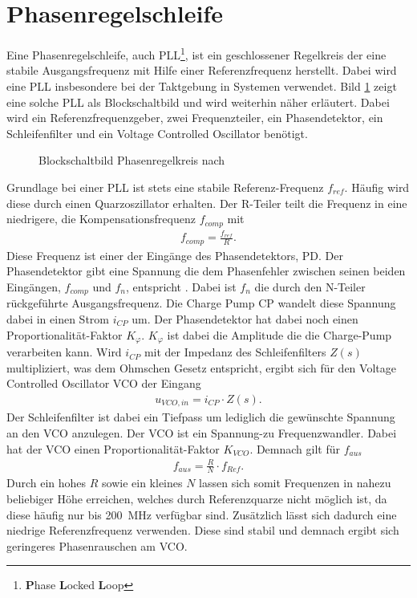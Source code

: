 \section{Phasenregelschleife}
Eine Phasenregelschleife, auch PLL\footnote{ \textbf{P}hase \textbf{L}ocked \textbf{L}oop}, ist ein geschlossener Regelkreis der eine stabile Ausgangsfrequenz mit Hilfe einer Referenzfrequenz herstellt. Dabei wird eine PLL insbesondere bei der Taktgebung in Systemen verwendet. Bild \ref{fig:PLL_Blockerino} zeigt eine solche PLL als Blockschaltbild und wird weiterhin näher erläutert. Dabei wird ein Referenzfrequenzgeber, zwei Frequenzteiler, ein Phasendetektor, ein Schleifenfilter und ein Voltage Controlled Oscillator benötigt.
\begin{figure}[tbp]
  \centering
  
  \caption{Blockschaltbild Phasenregelkreis nach \cite[S.9]{PLL_Perf}}
  \label{fig:PLL_Blockerino}
\end{figure}
Grundlage bei einer PLL ist stets eine stabile Referenz-Frequenz $f_{ref}$. Häufig wird diese durch einen Quarzoszillator erhalten. Der R-Teiler teilt die Frequenz in eine niedrigere, die Kompensationsfrequenz $f_{comp}$ mit 
\begin{align}
f_{comp} = \frac{f_{ref}}{R}.
\end{align} 
Diese Frequenz ist einer der Eingänge des Phasendetektors, PD. Der Phasendetektor gibt eine Spannung die dem Phasenfehler zwischen seinen beiden Eingängen, $f_{comp}$ und $f_{n}$, entspricht .  Dabei ist $f_{n}$ die durch den N-Teiler rückgeführte Ausgangsfrequenz. Die Charge Pump CP wandelt diese Spannung dabei in einen Strom $i_{CP}$ um. Der Phasendetektor hat dabei noch einen Proportionalität-Faktor $K_{\varphi}$. $K_{\varphi}$ ist dabei die Amplitude die die Charge-Pump verarbeiten kann. Wird $i_{CP}$ mit der Impedanz des Schleifenfilters $Z(s)$ multipliziert, was dem Ohmschen Gesetz entspricht, ergibt sich für den Voltage Controlled Oscillator VCO der Eingang 
\begin{align}
u_{VCO,in} = i_{CP}\cdot Z(s).
\end{align} 
Der Schleifenfilter ist dabei ein Tiefpass um lediglich die gewünschte Spannung an den VCO anzulegen. Der VCO ist ein Spannung-zu Frequenzwandler. Dabei hat der VCO einen Proportionalität-Faktor $K_{VCO}$. Demnach gilt für $f_{aus}$
\begin{align}
f_{aus} = \frac{R}{N} \cdot f_{Ref}.
\end{align} 
Durch ein hohes $R$ sowie ein kleines $N$ lassen sich somit Frequenzen in nahezu beliebiger Höhe erreichen, welches durch Referenzquarze nicht möglich ist, da diese häufig nur bis \SI{200}{\mega\hertz} verfügbar sind. Zusätzlich lässt sich dadurch eine niedrige Referenzfrequenz verwenden. Diese sind stabil und demnach ergibt sich geringeres Phasenrauschen am VCO.\\
